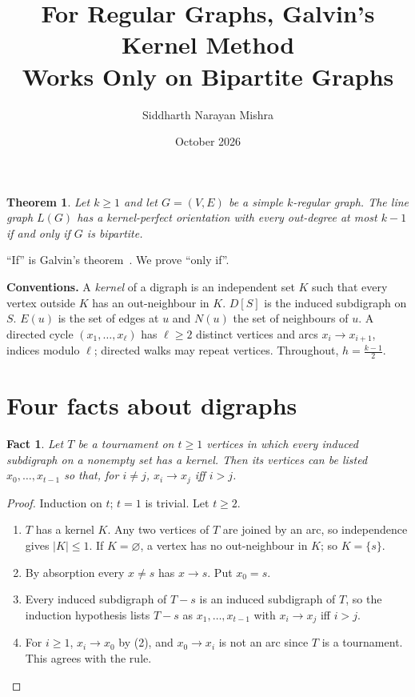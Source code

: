 \documentclass[11pt]{article}
\title{For Regular Graphs, Galvin's Kernel Method\\Works Only on Bipartite Graphs}
\author{Siddharth Narayan Mishra}
\date{October 2026}
\theoremstyle{plain}
\newtheorem*{theorem}{Theorem}
\newtheorem{fact}{Fact}
\theoremstyle{definition}
\newcommand{\LG}{L(G)}
\newcommand{\st}[1]{E(#1)}
\newcommand{\half}{h}
\newenvironment{steps}{\begin{enumerate}[label=(\arabic*),leftmargin=2.2em,itemsep=0.35em]}{\end{enumerate}}
\begin{document}
\maketitle

\begin{theorem}
Let $k\ge 1$ and let $G=(V,E)$ be a simple $k$-regular graph. The line graph $\LG$ has a
kernel-perfect orientation with every out-degree at most $k-1$ if and only if $G$ is bipartite.
\end{theorem}

``If'' is Galvin's theorem~\cite{galvin}. We prove ``only if''.

\textbf{Conventions.} A \emph{kernel} of a digraph is an independent set $K$ such that every
vertex outside $K$ has an out-neighbour in $K$. $D[S]$ is the induced subdigraph on $S$.
$\st{u}$ is the set of edges at $u$ and $N(u)$ the set of neighbours of $u$. A directed cycle
$(x_1,\dots,x_\ell)$ has $\ell\ge 2$ distinct vertices and arcs $x_i\to x_{i+1}$, indices modulo
$\ell$; directed walks may repeat vertices. Throughout, $\half=\tfrac{k-1}{2}$.

\section*{Four facts about digraphs}

\begin{fact}\label{f:tournament}
Let $T$ be a tournament on $t\ge 1$ vertices in which every induced subdigraph on a nonempty
set has a kernel. Then its vertices can be listed $x_0,\dots,x_{t-1}$ so that, for $i\ne j$,
$x_i\to x_j$ iff $i>j$.
\end{fact}

\begin{proof}
Induction on $t$; $t=1$ is trivial. Let $t\ge 2$.
\begin{steps}
  \item $T$ has a kernel $K$. Any two vertices of $T$ are joined by an arc, so independence gives
    $|K|\le 1$. If $K=\varnothing$, a vertex has no out-neighbour in $K$; so $K=\{s\}$.
  \item By absorption every $x\ne s$ has $x\to s$. Put $x_0=s$.
  \item Every induced subdigraph of $T-s$ is an induced subdigraph of $T$, so the induction
    hypothesis lists $T-s$ as $x_1,\dots,x_{t-1}$ with $x_i\to x_j$ iff $i>j$.
  \item For $i\ge 1$, $x_i\to x_0$ by (2), and $x_0\to x_i$ is not an arc since $T$ is a
    tournament. This agrees with the rule. \qedhere
\end{steps}
\end{proof}
\end{document}

